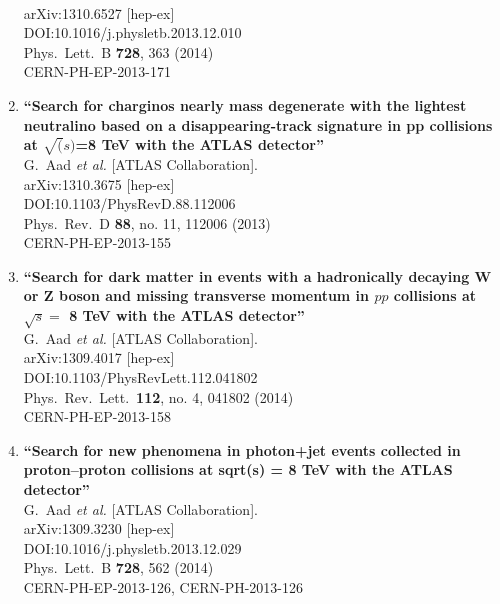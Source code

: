 \documentclass{article}
\begin{document}
\begin{enumerate}
  \\{}arXiv:1310.6527 [hep-ex]
  \\{}DOI:10.1016/j.physletb.2013.12.010
  \\{}Phys.\ Lett.\ B {\bf 728}, 363 (2014)
  \\{}CERN-PH-EP-2013-171
\item%
{\bf ``Search for charginos nearly mass degenerate with the lightest neutralino based on a disappearing-track signature in pp collisions at  $\sqrt(s)$=8  TeV with the ATLAS detector''}
  \\{}G.~Aad {\it et al.} [ATLAS Collaboration].
  \\{}arXiv:1310.3675 [hep-ex]
  \\{}DOI:10.1103/PhysRevD.88.112006
  \\{}Phys.\ Rev.\ D {\bf 88}, no. 11, 112006 (2013)
  \\{}CERN-PH-EP-2013-155
\item%
{\bf ``Search for dark matter in events with a hadronically decaying W or Z boson and missing transverse momentum in $pp$ collisions at $\sqrt{s} =$ 8 TeV with the ATLAS detector''}
  \\{}G.~Aad {\it et al.} [ATLAS Collaboration].
  \\{}arXiv:1309.4017 [hep-ex]
  \\{}DOI:10.1103/PhysRevLett.112.041802
  \\{}Phys.\ Rev.\ Lett.\  {\bf 112}, no. 4, 041802 (2014)
  \\{}CERN-PH-EP-2013-158
\item%
{\bf ``Search for new phenomena in photon+jet events collected in proton--proton collisions at sqrt(s) = 8 TeV with the ATLAS detector''}
  \\{}G.~Aad {\it et al.} [ATLAS Collaboration].
  \\{}arXiv:1309.3230 [hep-ex]
  \\{}DOI:10.1016/j.physletb.2013.12.029
  \\{}Phys.\ Lett.\ B {\bf 728}, 562 (2014)
  \\{}CERN-PH-EP-2013-126, CERN-PH-2013-126

\end{enumerate}
\end{document}
